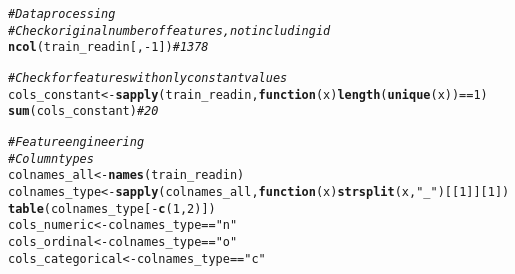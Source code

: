 \documentclass{article}\usepackage[]{graphicx}\usepackage[]{color}
\makeatletter
\newcommand{\hlnum}[1]{\textcolor[rgb]{0.686,0.059,0.569}{#1}}%
\newcommand{\hlstr}[1]{\textcolor[rgb]{0.192,0.494,0.8}{#1}}%
\newcommand{\hlcom}[1]{\textcolor[rgb]{0.678,0.584,0.686}{\textit{#1}}}%
\newcommand{\hlopt}[1]{\textcolor[rgb]{0,0,0}{#1}}%
\newcommand{\hlstd}[1]{\textcolor[rgb]{0.345,0.345,0.345}{#1}}%
\newcommand{\hlkwa}[1]{\textcolor[rgb]{0.161,0.373,0.58}{\textbf{#1}}}%
\newcommand{\hlkwb}[1]{\textcolor[rgb]{0.69,0.353,0.396}{#1}}%
\newcommand{\hlkwc}[1]{\textcolor[rgb]{0.333,0.667,0.333}{#1}}%
\newcommand{\hlkwd}[1]{\textcolor[rgb]{0.737,0.353,0.396}{\textbf{#1}}}%
\newenvironment{kframe}{%
 \def\at@end@of@kframe{}%
 \ifinner\ifhmode%
  \def\at@end@of@kframe{\end{minipage}}%
  \begin{minipage}{\columnwidth}%
 \fi\fi%
 \def\FrameCommand##1{\hskip\@totalleftmargin \hskip-\fboxsep
 \colorbox{shadecolor}{##1}\hskip-\fboxsep
     \hskip-\linewidth \hskip-\@totalleftmargin \hskip\columnwidth}%
 \MakeFramed {\advance\hsize-\width
   \@totalleftmargin\z@ \linewidth\hsize
   \@setminipage}}%
 {\par\unskip\endMakeFramed%
 \at@end@of@kframe}
\newenvironment{knitrout}{}{} %
\makeatother
\begin{document}
\begin{knitrout}
\begin{kframe}
\begin{alltt}
\hlcom{# Data processing}
\hlcom{# Check original number of features, not including id}
\hlkwd{ncol}\hlstd{(train_readin[,} \hlopt{-}\hlnum{1}\hlstd{])} \hlcom{# 1378}

\hlcom{# Check for features with only constant values}
\hlstd{cols_constant} \hlkwb{<-} \hlkwd{sapply}\hlstd{(train_readin,} \hlkwa{function}\hlstd{(}\hlkwc{x}\hlstd{)} \hlkwd{length}\hlstd{(}\hlkwd{unique}\hlstd{(x))} \hlopt{==} \hlnum{1}\hlstd{)}
\hlkwd{sum}\hlstd{(cols_constant)} \hlcom{# 20}

\hlcom{# Feature engineering}
\hlcom{# Column types}
\hlstd{colnames_all} \hlkwb{<-} \hlkwd{names}\hlstd{(train_readin)}
\hlstd{colnames_type} \hlkwb{<-} \hlkwd{sapply}\hlstd{(colnames_all,} \hlkwa{function}\hlstd{(}\hlkwc{x}\hlstd{)} \hlkwd{strsplit}\hlstd{(x,} \hlstr{"_"}\hlstd{)[[}\hlnum{1}\hlstd{]][}\hlnum{1}\hlstd{])}
\hlkwd{table}\hlstd{(colnames_type[}\hlopt{-}\hlkwd{c}\hlstd{(}\hlnum{1}\hlstd{,} \hlnum{2}\hlstd{)])}
\hlstd{cols_numeric} \hlkwb{<-} \hlstd{colnames_type} \hlopt{==} \hlstr{"n"}
\hlstd{cols_ordinal} \hlkwb{<-} \hlstd{colnames_type} \hlopt{==} \hlstr{"o"}
\hlstd{cols_categorical} \hlkwb{<-} \hlstd{colnames_type} \hlopt{==} \hlstr{"c"}


\end{alltt}
\end{kframe}
\end{knitrout}
\end{document}
